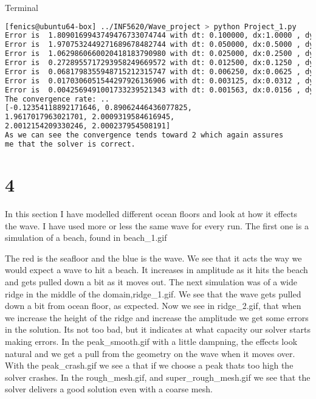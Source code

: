 \documentclass[a4paper,norsk]{article}
\begin{document}
\noindent Terminal
\begin{lstlisting}[language=bash]
[fenics@ubuntu64-box] ../INF5620/Wave_project > python Project_1.py 
Error is  1.8090169943749476733074744 with dt: 0.100000, dx:1.0000 , dy:1.0000 
Error is  1.9707532449271689678482744 with dt: 0.050000, dx:0.5000 , dy:0.5000 
Error is  1.0629860660020418183790980 with dt: 0.025000, dx:0.2500 , dy:0.2500 
Error is  0.2728955717293958249669572 with dt: 0.012500, dx:0.1250 , dy:0.1250 
Error is  0.0681798355948715212315747 with dt: 0.006250, dx:0.0625 , dy:0.0625 
Error is  0.0170306051544297926136906 with dt: 0.003125, dx:0.0312 , dy:0.0312
Error is  0.0042569491001733239521343 with dt: 0.001563, dx:0.0156 , dy:0.0156 
The convergence rate: .. 
[-0.12354118892171646, 0.89062446436077825, 
1.9617017963021701, 2.0009319584616945, 
2.0012154209330246, 2.000237954508191]
As we can see the convergence tends toward 2 which again assures 
me that the solver is correct. 

\end{lstlisting}



\section*{4}

In this section I have modelled different ocean floors and look at how it effects the wave. I have used more or less the same wave for every run.
The first one is a simulation of a beach, found in beach\_1.gif  

The red is the seafloor and the blue is the wave. We see that it acts the way we would expect a wave to hit a beach. It increases in amplitude as it hits the beach and gets pulled down a bit as it moves out.
The next simulation was of a wide ridge in the middle of the domain,ridge\_1.gif. We see that the wave gets pulled down a bit from ocean floor, as expected. Now we see in ridge\_2.gif, that when we increase the height of the ridge and increase the amplitude we get some errors in the solution. Its not too bad, but it indicates at what capacity our solver starts making errors.
In the peak\_smooth.gif with a little dampning, the effects look natural and we get a pull from the geometry on the wave when it moves over.
With the peak\_crash.gif we see a that if we choose a peak thats too high the solver crashes.
In the rough\_mesh.gif, and super\_rough\_mesh.gif we see that the solver delivers a good solution even with a coarse mesh.
\end{document}
